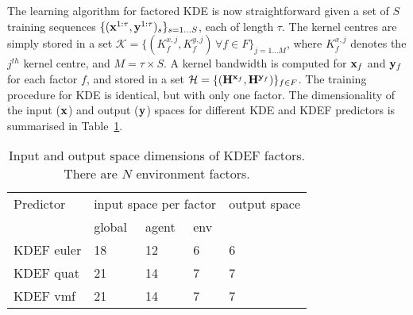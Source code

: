 
The learning algorithm for factored KDE is now straightforward given a set of $S$ training sequences $\{ (\mathbf{x}^{1:\tau} , \mathbf{y}^{1:\tau})_s \}_{s = 1 \ldots S}$, each of length $\tau$. The kernel centres are simply stored in a set $\mathcal{K} = \{ ( K^{x,j}_f ,  K^{y,j}_f ) \, \forall f \in F \}_{ j = 1 \ldots M}$, where $K^{x,j}_f$ denotes the $j^{th}$ kernel centre, and $M= \tau \times S$. A kernel bandwidth is computed for $\mathbf{x}_f$ and $\mathbf{y}_f$ for each factor $f$, and stored in a set $\mathcal{H} = \{ (\mathbf{H}^{\mathbf{x}_f},  \mathbf{H}^{\mathbf{y}_f} ) \}_{f \in F}$. The training procedure for KDE is identical, but with only one factor. The dimensionality of the input ($\mathbf{x}$) and output ($\mathbf{y}$) spaces for different KDE and KDEF predictors is summarised in Table~\ref{tab:InpOutSpaceKDE}.

\begin{table}[b]
\begin{center}
\begin{tabular}{|l|l|l|l|l|}
\cline{1-5}
Predictor & \multicolumn{3}{|c|}{input space per factor} & output space \\
\cline{2-4}
 & global & agent & env & \\
\cline{1-5}
KDEF euler & 18 & 12 & 6 & 6 \\
KDEF quat & 21 & 14 & 7 & 7 \\
KDEF vmf & 21 & 14 & 7 & 7 \\
\cline{1-5}
\end{tabular}
\end{center}
\caption[Input/output space KDEF]{Input and output space dimensions of KDEF factors. There are $N$ environment factors.}\label{tab:InpOutSpaceKDE}
\end{table}


